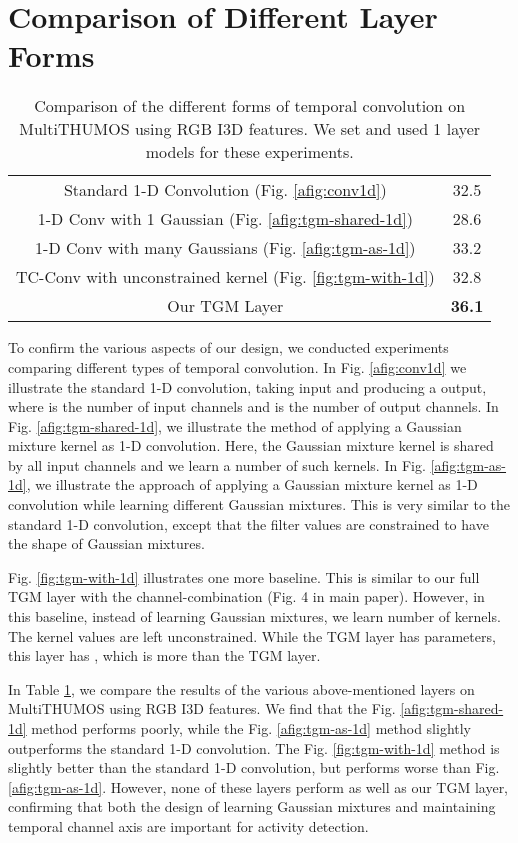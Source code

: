 \documentclass{article}
\begin{document}
\section{Comparison of Different Layer Forms}
\begin{table}
\caption{Comparison of the different forms of temporal convolution on MultiTHUMOS using RGB I3D features. We set  and used 1 layer models for these experiments.}
\label{atab:layer-types}
\centering
\begin{tabular}{c|c}
\toprule
Standard 1-D Convolution (Fig. \ref{afig:conv1d})      & 32.5  \\
1-D Conv with 1 Gaussian (Fig. \ref{afig:tgm-shared-1d})         & 28.6  \\
1-D Conv with many Gaussians (Fig. \ref{afig:tgm-as-1d})      & 33.2 \\
TC-Conv with unconstrained kernel (Fig. \ref{fig:tgm-with-1d})     & 32.8   \\
Our TGM Layer   & \textbf{36.1} \\
\bottomrule
\end{tabular}
\end{table}

To confirm the various aspects of our design, we conducted experiments comparing different types of temporal convolution. In Fig. \ref{afig:conv1d} we illustrate the standard 1-D convolution, taking  input and producing a  output, where  is the number of input channels and  is the number of output channels. In Fig. \ref{afig:tgm-shared-1d}, we illustrate the method of applying a Gaussian mixture kernel as 1-D convolution. Here, the Gaussian mixture kernel is shared by all  input channels and we learn a  number of such kernels. In Fig. \ref{afig:tgm-as-1d}, we illustrate the approach of applying a Gaussian mixture kernel as 1-D convolution while learning  different Gaussian mixtures. This is very similar to the standard 1-D convolution, except that the filter values are constrained to have the shape of Gaussian mixtures.

Fig. \ref{fig:tgm-with-1d} illustrates one more baseline. This is similar to our full TGM layer with the channel-combination (Fig. 4 in main paper). However, in this baseline, instead of learning Gaussian mixtures, we learn  number of  kernels. The kernel values are left unconstrained.
While the TGM layer has  parameters, this layer has , which is more than the TGM layer.

In Table \ref{atab:layer-types}, we compare the results of the various above-mentioned layers on MultiTHUMOS using RGB I3D features. We find that the Fig. \ref{afig:tgm-shared-1d} method performs poorly, while the Fig. \ref{afig:tgm-as-1d} method slightly outperforms the standard 1-D convolution.
The Fig. \ref{fig:tgm-with-1d} method is slightly better than the standard 1-D convolution, but performs worse than Fig. \ref{afig:tgm-as-1d}.
However, none of these layers perform as well as our TGM layer, confirming that both the design of learning Gaussian mixtures and maintaining temporal channel axis are important for activity detection.
\end{document}
